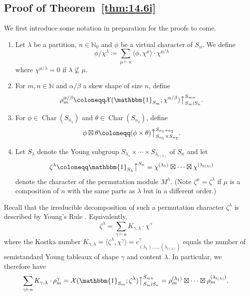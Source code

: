 \documentclass[ALCO, Unicode]{cedram}
\newcommand{\triv}{\mathbbm{1}}
\newcommand{\Ch}{\operatorname{Char}}
\newcommand{\up}{\big\uparrow}
\newcommand{\cX}{\mathcal{X}}
\newcommand{\N}{\mathbb{N}}
\begin{document}
\subsection{Proof of Theorem~\ref{thm:14.6i}}\label{sec:16}
We first introduce some notation in preparation for the proofs to come.
\begin{notation}\label{not:rho}
	\begin{enumerate}[label=\textup{(\roman*)}]
		\item \label{561} Let $\lambda$ be a partition, $n\in\N_0$ and $\phi$ be a virtual character of $S_n$.
		We define
		\[ \phi/\chi^\lambda\coloneqq  \sum_{\mu\vdash n}\langle \phi,\chi^\mu\rangle\cdot\chi^{\mu/\lambda} \]
		where $\chi^{\mu/\lambda}=0$ if $\lambda\not\subseteq\mu$.
		
		\item \label{562} For $m,n\in\N$ and $\alpha/\beta$ a skew shape of size $n$, define \[
		\rho^{\alpha/\beta}_m \coloneqq  \cX(\triv_{S_m};\chi^{\alpha/\beta})\up_{S_m\wr S_n}^{S_{mn}}.\] 
		
		\item \label{563} For $\phi\in\Ch(S_{n_1})$ and $\theta\in\Ch(S_{n_2})$, define
		\[ \phi\boxtimes\theta\coloneqq  (\phi\times\theta)\up_{S_{n_1}\times S_{n_2}}^{S_{n_1+n_2}}. \]
		
		\item \label{564} Let $S_\lambda$ denote the Young subgroup $S_{\lambda_1}\times\cdots\times S_{\lambda_{l(\lambda)}}$ of $S_n$ and let
		\[ \zeta^\lambda\coloneqq \triv_{S_\lambda}\up^{S_n} = \chi^{(\lambda_1)}\boxtimes\cdots\boxtimes \chi^{(\lambda_{l(\lambda)})} \]
		denote the character of the permutation module $M^\lambda$. (Note $\zeta^\mu=\zeta^\lambda$ if $\mu$ is a composition of $n$ with the same parts as $\lambda$ but in a different order.) 
	\end{enumerate}
\end{notation}

Recall that the irreducible decomposition of such a permutation character $\zeta^\lambda$ is described by Young's Rule \cite[2.8.5]{JK}. Equivalently,
\begin{equation}\label{eqn:kostka}
	\zeta^\lambda = \sum_{\gamma\vdash n} K_{\gamma,\lambda}\cdot \chi^\gamma
\end{equation}
where the Kostka number $K_{\gamma,\lambda} = \langle \zeta^\lambda,\chi^\gamma\rangle=c^\gamma_{(\lambda_1),\dotsc,(\lambda_{l(\lambda)})}$ equals the number of semistandard Young tableaux of shape $\gamma$ and content $\lambda$.
In particular, we therefore have
\begin{equation}\label{eqn:15.2}
	\sum_{\gamma\vdash n} K_{\gamma,\lambda}\cdot \rho^\gamma_m = \cX(\triv_{S_m}; \zeta^\lambda)\up_{S_m\wr S_n}^{S_{mn}} = \rho^{(\lambda_1)}_m\boxtimes\cdots\boxtimes\rho^{(\lambda_{l(\lambda)})}_m.
\end{equation}
\end{document}
